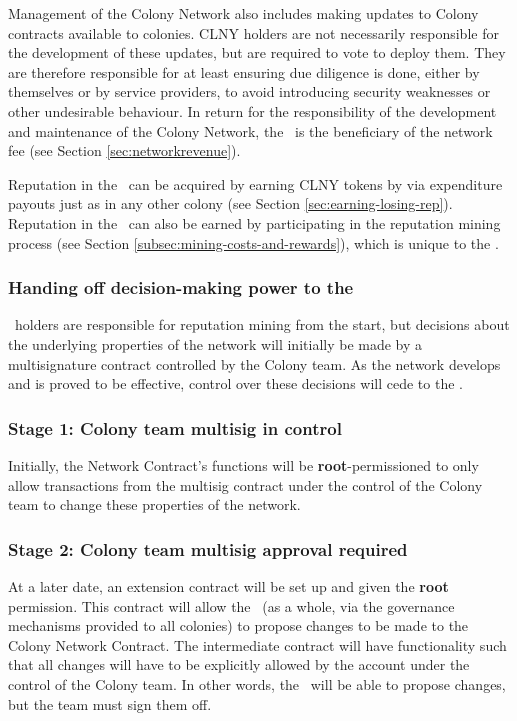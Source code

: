 Management of the Colony Network also includes making updates to Colony contracts available to colonies. CLNY holders are not necessarily responsible for the development of these updates, but are required to vote to deploy them. They are therefore responsible for at least ensuring due diligence is done, either by themselves or by service providers, to avoid introducing security weaknesses or other undesirable behaviour. In return for the responsibility of the development and maintenance of the Colony Network, the \rc\ is the beneficiary of the network fee (see Section \ref{sec:networkrevenue}).

Reputation in the \rc\ can be acquired by earning CLNY tokens by via expenditure payouts just as in any other colony (see Section \ref{sec:earning-losing-rep}). Reputation in the \rc\ can also be earned by participating in the reputation mining process (see Section \ref{subsec:mining-costs-and-rewards}), which is unique to the \rc.

\subsubsection{Handing off decision-making power to the \rc}\label{subsec:ceding-control-to-rc}

\rct\ holders are responsible for reputation mining from the start, but decisions about the underlying properties of the network will initially be made by a multisignature contract controlled by the Colony team. As the network develops and is proved to be effective, control over these decisions will cede to the \rc.

\subsubsection*{Stage 1: Colony team multisig in control}
 Initially, the Network Contract's functions will be \textbf{root}-permissioned to only allow transactions from the multisig contract under the control of the Colony team to change these properties of the network.

\subsubsection*{Stage 2: Colony team multisig approval required}
At a later date, an extension contract will be set up and given the \textbf{root} permission. This contract will allow the \rc\ (as a whole, via the governance mechanisms provided to all colonies) to propose changes to be made to the Colony Network Contract. The intermediate contract will have functionality such that all changes will have to be explicitly allowed by the account under the control of the Colony team. In other words, the \rc\ will be able to propose changes, but the team must sign them off.

